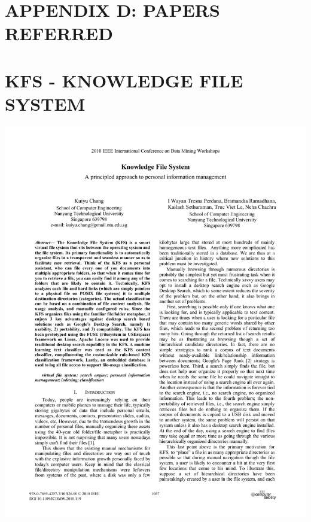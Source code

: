 \section*{APPENDIX D: PAPERS REFERRED}

\section{KFS - KNOWLEDGE FILE SYSTEM}
\hspace*{-1.5cm}
\includegraphics[page=1,scale=0.75]{./appendix/KFS.pdf}



